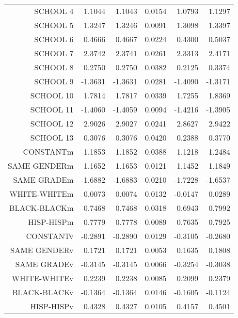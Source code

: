 \begin{table}[ht]
\begin{tabular}{rrrrrr}
  SCHOOL 4 & 1.1044 & 1.1043 & 0.0154 & 1.0793 & 1.1297 \\ 
  SCHOOL 5 & 1.3247 & 1.3246 & 0.0091 & 1.3098 & 1.3397 \\ 
  SCHOOL 6 & 0.4666 & 0.4667 & 0.0224 & 0.4300 & 0.5037 \\ 
  SCHOOL 7 & 2.3742 & 2.3741 & 0.0261 & 2.3313 & 2.4171 \\ 
  SCHOOL 8 & 0.2750 & 0.2750 & 0.0382 & 0.2125 & 0.3374 \\ 
  SCHOOL 9 & -1.3631 & -1.3631 & 0.0281 & -1.4090 & -1.3171 \\ 
  SCHOOL 10 & 1.7814 & 1.7817 & 0.0339 & 1.7255 & 1.8369 \\ 
  SCHOOL 11 & -1.4060 & -1.4059 & 0.0094 & -1.4216 & -1.3905 \\ 
  SCHOOL 12 & 2.9026 & 2.9027 & 0.0241 & 2.8627 & 2.9422 \\ 
  SCHOOL 13 & 0.3076 & 0.3076 & 0.0420 & 0.2388 & 0.3770 \\ 
  CONSTANTm & 1.1853 & 1.1852 & 0.0388 & 1.1218 & 1.2484 \\ 
  SAME GENDERm & 1.1652 & 1.1653 & 0.0121 & 1.1452 & 1.1849 \\ 
  SAME GRADEm & -1.6882 & -1.6883 & 0.0210 & -1.7228 & -1.6537 \\ 
  WHITE-WHITEm & 0.0073 & 0.0074 & 0.0132 & -0.0147 & 0.0289 \\ 
  BLACK-BLACKm & 0.7468 & 0.7468 & 0.0318 & 0.6943 & 0.7992 \\ 
  HISP-HISPm & 0.7779 & 0.7778 & 0.0089 & 0.7635 & 0.7925 \\ 
  CONSTANTv & -0.2891 & -0.2890 & 0.0129 & -0.3105 & -0.2680 \\ 
  SAME GENDERv & 0.1721 & 0.1721 & 0.0053 & 0.1635 & 0.1808 \\ 
  SAME GRADEv & -0.3145 & -0.3145 & 0.0066 & -0.3254 & -0.3038 \\ 
  WHITE-WHITEv & 0.2239 & 0.2238 & 0.0085 & 0.2099 & 0.2379 \\ 
  BLACK-BLACKv & -0.1364 & -0.1364 & 0.0146 & -0.1605 & -0.1124 \\ 
  HISP-HISPv & 0.4328 & 0.4327 & 0.0105 & 0.4157 & 0.4501 \\ 
   \hline
\end{tabular}
\end{table}






